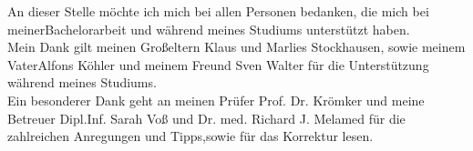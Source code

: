 \label{cha:danksagung}
An  dieser Stelle möchte ich mich bei allen Personen bedanken, die mich  bei  meinerBachelorarbeit und während meines Studiums  unterstützt haben.\\
Mein Dank gilt meinen Großeltern Klaus und Marlies Stockhausen, sowie meinem VaterAlfons Köhler und meinem Freund Sven Walter für die Unterstützung während meines Studiums. \\
Ein besonderer Dank geht an meinen Prüfer Prof. Dr. Krömker und meine Betreuer Dipl.Inf. Sarah Voß und Dr. med. Richard J. Melamed für die zahlreichen Anregungen und Tipps,sowie für das Korrektur lesen.




